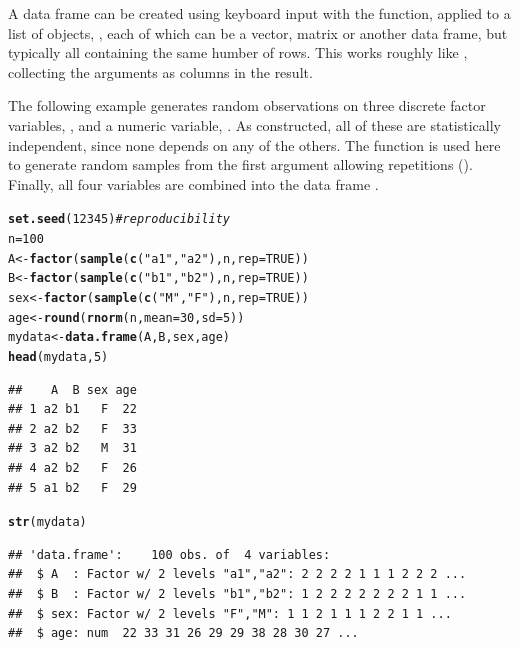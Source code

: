 \documentclass[11pt]{book}\usepackage[]{graphicx}\usepackage[]{color}
\makeatletter
\newcommand{\hlnum}[1]{\textcolor[rgb]{0.686,0.059,0.569}{#1}}%
\newcommand{\hlstr}[1]{\textcolor[rgb]{0.192,0.494,0.8}{#1}}%
\newcommand{\hlcom}[1]{\textcolor[rgb]{0.678,0.584,0.686}{\textit{#1}}}%
\newcommand{\hlstd}[1]{\textcolor[rgb]{0.345,0.345,0.345}{#1}}%
\newcommand{\hlkwb}[1]{\textcolor[rgb]{0.69,0.353,0.396}{#1}}%
\newcommand{\hlkwc}[1]{\textcolor[rgb]{0.333,0.667,0.333}{#1}}%
\newcommand{\hlkwd}[1]{\textcolor[rgb]{0.737,0.353,0.396}{\textbf{#1}}}%
\newenvironment{kframe}{%
 \def\at@end@of@kframe{}%
 \ifinner\ifhmode%
  \def\at@end@of@kframe{\end{minipage}}%
  \begin{minipage}{\columnwidth}%
 \fi\fi%
 \def\FrameCommand##1{\hskip\@totalleftmargin \hskip-\fboxsep
 \colorbox{shadecolor}{##1}\hskip-\fboxsep
     \hskip-\linewidth \hskip-\@totalleftmargin \hskip\columnwidth}%
 \MakeFramed {\advance\hsize-\width
   \@totalleftmargin\z@ \linewidth\hsize
   \@setminipage}}%
 {\par\unskip\endMakeFramed%
 \at@end@of@kframe}
\newenvironment{knitrout}{}{} %
\renewenvironment{knitrout}{\small\renewcommand{\baselinestretch}{.85}}{} %
\makeatother
\begin{document}
A data frame can be created using keyboard input 
with the  function, applied to a list of objects,
, each of which can be a vector, matrix or another
data frame, but typically all containing the same humber of rows.
This works roughly like , collecting the arguments as columns
in the result.

The following example generates  random observations on 
three discrete factor variables, , and a numeric
variable, .  As constructed, all of these are 
statistically independent, since none depends on any of the others.
The function 
is used here to generate  random samples from the
first argument allowing repetitions ().
Finally, all four variables are combined into the data frame
.


\begin{knitrout}
\color{fgcolor}\begin{kframe}
\begin{alltt}
\hlkwd{set.seed}\hlstd{(}\hlnum{12345}\hlstd{)}   \hlcom{# reproducibility}
\hlstd{n}\hlkwb{=}\hlnum{100}
\hlstd{A} \hlkwb{<-} \hlkwd{factor}\hlstd{(}\hlkwd{sample}\hlstd{(}\hlkwd{c}\hlstd{(}\hlstr{"a1"}\hlstd{,}\hlstr{"a2"}\hlstd{), n,} \hlkwc{rep}\hlstd{=}\hlnum{TRUE}\hlstd{))}
\hlstd{B} \hlkwb{<-} \hlkwd{factor}\hlstd{(}\hlkwd{sample}\hlstd{(}\hlkwd{c}\hlstd{(}\hlstr{"b1"}\hlstd{,}\hlstr{"b2"}\hlstd{), n,} \hlkwc{rep}\hlstd{=}\hlnum{TRUE}\hlstd{))}
\hlstd{sex} \hlkwb{<-} \hlkwd{factor}\hlstd{(}\hlkwd{sample}\hlstd{(}\hlkwd{c}\hlstd{(}\hlstr{"M"}\hlstd{,} \hlstr{"F"}\hlstd{), n,} \hlkwc{rep}\hlstd{=}\hlnum{TRUE}\hlstd{))}
\hlstd{age} \hlkwb{<-} \hlkwd{round}\hlstd{(}\hlkwd{rnorm}\hlstd{(n,} \hlkwc{mean}\hlstd{=}\hlnum{30}\hlstd{,} \hlkwc{sd}\hlstd{=}\hlnum{5}\hlstd{))}
\hlstd{mydata} \hlkwb{<-} \hlkwd{data.frame}\hlstd{(A, B, sex, age)}
\hlkwd{head}\hlstd{(mydata,}\hlnum{5}\hlstd{)}
\end{alltt}
\begin{verbatim}
##    A  B sex age
## 1 a2 b1   F  22
## 2 a2 b2   F  33
## 3 a2 b2   M  31
## 4 a2 b2   F  26
## 5 a1 b2   F  29
\end{verbatim}
\begin{alltt}
\hlkwd{str}\hlstd{(mydata)}
\end{alltt}
\begin{verbatim}
## 'data.frame':	100 obs. of  4 variables:
##  $ A  : Factor w/ 2 levels "a1","a2": 2 2 2 2 1 1 1 2 2 2 ...
##  $ B  : Factor w/ 2 levels "b1","b2": 1 2 2 2 2 2 2 2 1 1 ...
##  $ sex: Factor w/ 2 levels "F","M": 1 1 2 1 1 1 2 2 1 1 ...
##  $ age: num  22 33 31 26 29 29 38 28 30 27 ...
\end{verbatim}
\end{kframe}
\end{knitrout}
\end{document}
